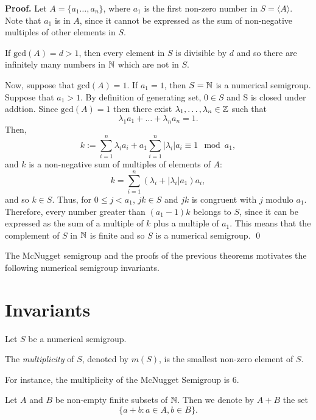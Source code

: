 \textbf{Proof. } Let $A = \{a_{1} \ldots, a_{n}\}$, where $a_1$ is the first non-zero number in $S = \langle A \rangle$. Note that $a_1$ is in $A$, since it cannot be expressed as the sum of non-negative multiples of other elements in $S$. \par
If $\text{gcd}(A) = d > 1$, then every element in $S$ is divisible by $d$ and so there are infinitely many numbers in $\mathbb{N}$ which are not in $S$. \par
Now, suppose that $\text{gcd}(A) = 1$. If $a_1 = 1$, then $S = \mathbb{N}$ is a numerical semigroup. Suppose that $a_1 > 1$. By definition of generating set, $0 \in S$ and S is closed under addtion. Since $\text{gcd}(A) = 1$ then there exist $\lambda_1, \ldots, \lambda_n \in \mathbb{Z}$ such that 
\[\lambda_1a_1 + \ldots + \lambda_na_n = 1.\]
Then, 
\[
    k := \sum_{i = 1}^n \lambda_ia_i + a_1\sum_{i = 1}^n|\lambda_i|a_i \equiv 1 \mod a_1,
\]
and $k$ is a non-negative sum of multiples of elements of $A$: 
\[k = \sum_{i = 1}^n (\lambda_i + |\lambda_i|a_1)a_i,\]
and so $k \in S$. Thus, for $0 \leq j < a_1$, $jk \in S$ and $jk$ is congruent with $j$ modulo $a_1$. Therefore, every number greater than $(a_1 - 1)k$ belongs to $S$, since it can be expressed as the sum of a multiple of $k$ plus a multiple of $a_1$.  This means that the complement of $S$ in $\mathbb{N}$ is finite and so $S$ is a numerical semigroup. \qed \par

The McNugget semigroup and the proofs of the previous theorems motivates the following numerical semigroup invariants. \par 

\section{Invariants}\label{sec:smgps:invariants}

Let $S$ be a numerical semigroup. \par

\begin{definition}\label{def:smgps:multiplicity}
    The \textit{multiplicity} of $S$, denoted by $m(S)$, is the smallest non-zero element of $S$.
\end{definition}

For instance, the multiplicity of the McNugget Semigroup is 6. \par

Let $A$ and $B$ be non-empty finite subsets of $\mathbb{N}$. Then we denote by $A + B$ the set \[\{a + b : a \in A, b \in B\}.\] 

